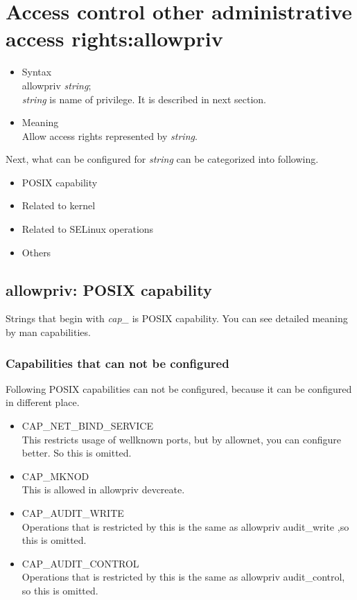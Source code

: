 \documentclass{article}
\begin{document}
\section{Access control other administrative access
  rights:allowpriv}
\begin{itemize}
 \item Syntax \\
       allowpriv {\it string};\\
       {\it string} is name  of privilege. It is described in next section.
 \item Meaning \\
       Allow access rights represented by        {\it string}.
\end{itemize}
Next, 
what can be configured for {\it string} can be categorized into
following.
\begin{itemize}
 \item POSIX capability\\
 \item Related to kernel\\
 \item Related to SELinux operations\\
 \item Others
\end{itemize}


\subsection{allowpriv: POSIX capability}
Strings that begin with {\it cap\_} is POSIX capability. You can see
detailed meaning by man capabilities.

\subsubsection{Capabilities that can not be configured}
Following POSIX capabilities can not be configured, because it can be
configured in different place. \\
\begin{itemize}
 \item CAP\_NET\_BIND\_SERVICE\\
       This restricts usage of wellknown ports, but by allownet, you can
       configure better. So this is omitted.
 \item CAP\_MKNOD\\
       This is allowed in allowpriv devcreate.
 \item CAP\_AUDIT\_WRITE\\
       Operations that is restricted by this is the same as
       allowpriv audit\_write ,so this  is omitted.
 \item CAP\_AUDIT\_CONTROL\\
       Operations that is  restricted by this is the same as allowpriv
       audit\_control, so this is  omitted.
\end{itemize}
\end{document}
